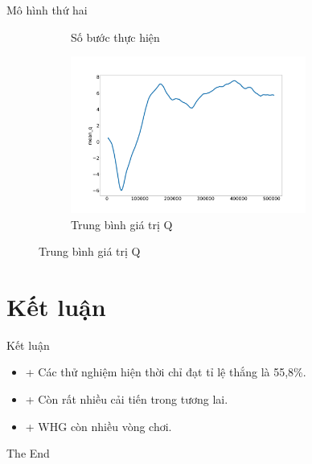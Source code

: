 \documentclass{beamer}
\begin{document}
\begin{frame}{Mô hình thứ hai}
\begin{figure}[ht]
\begin{subfigure}{.5\textwidth}
    		\caption{Số bước thực hiện}
    		\label{fig:baseline_step}
    	\end{subfigure}%
    	\begin{subfigure}{.5\textwidth}
    		\includegraphics[width=0.85\textwidth]{Pic/Second_model/mean_q.png}
    		\caption{Trung bình giá trị Q}
    		\label{fig:baseline_mean_q}
    	\end{subfigure}
    	\label{fig:result_baseline}
    \end{figure}
\end{frame}
\section{Kết luận}
\begin{frame}{Kết luận}
    \begin{itemize}
        \item + Các thử nghiệm hiện thời chỉ đạt tỉ lệ thắng là 55,8\%.
        \vspace{0.5cm}
        \item + Còn rất nhiều cải tiến trong tương lai.
        \vspace{0.5cm}
        \item + WHG còn nhiều vòng chơi.
    \end{itemize}
\end{frame}

\begin{frame}
\Huge{\centerline{The End}}
\end{frame}

\end{document}
